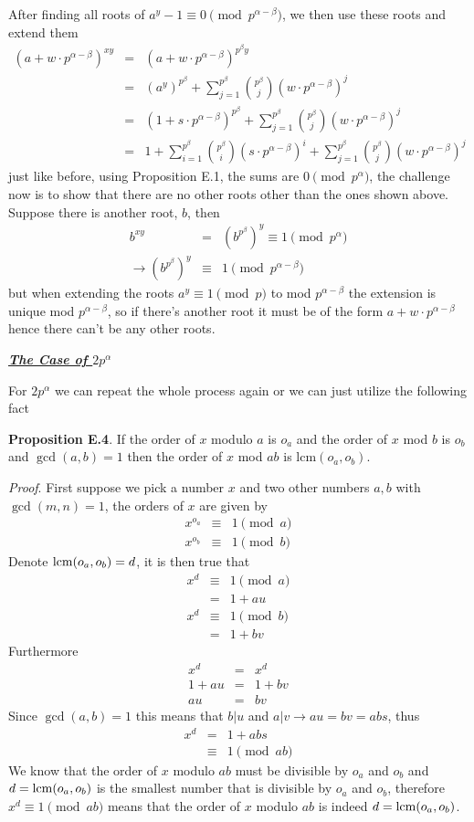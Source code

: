 \documentclass[aps,preprint,preprintnumbers,nofootinbib,showpacs,prd]{revtex4-1}
\newcommand{\nbea}{\begin{eqnarray*}}
\newcommand{\neea}{\end{eqnarray*}}
\begin{document}
After finding all roots of $a^y - 1 \equiv 0 \pmod{p^{\alpha-\beta}}$, we then use these roots and extend them
%
\nbea
(a + w\cdot p^{\alpha-\beta})^{xy} & = & (a + w\cdot p^{\alpha-\beta})^{p^\beta y} \\
& = & (a^y)^{p^\beta} + \sum_{j=1}^{p^\beta} \binom{p^\beta}{j} (w\cdot p^{\alpha-\beta})^j \\
& = & (1 + s\cdot p^{\alpha-\beta})^{p^\beta} + \sum_{j=1}^{p^\beta} \binom{p^\beta}{j} (w\cdot p^{\alpha-\beta})^j \\
& = & 1 + \sum_{i=1}^{p^\beta} \binom{p^\beta}{i} (s\cdot p^{\alpha-\beta})^i + \sum_{j=1}^{p^\beta} \binom{p^\beta}{j} (w\cdot p^{\alpha-\beta})^j
\neea
%
just like before, using Proposition E.1, the sums are $0 \pmod{p^\alpha}$, the challenge now is to show that there are no other roots other than the ones shown above. Suppose there is another root, $b$, then
%
\nbea
b^{xy} & = & \left(b^{p^\beta}\right)^{y} \equiv 1 \pmod{p^\alpha} \\
\to \left(b^{p^\beta}\right)^y & \equiv & 1 \pmod{p^{\alpha-\beta}}
\neea
%
but when extending the roots $a^y \equiv 1 \pmod{p}$ to mod $p^{\alpha-\beta}$ the extension is unique mod $p^{\alpha-\beta}$, so if there's another root it must be of the form $a + w\cdot p^{\alpha-\beta}$ hence there can't be any other roots.

\bigskip
\underline{\textbf{\textit{The Case of $2p^\alpha$}}}
\bigskip

For $2p^\alpha$ we can repeat the whole process again or we can just utilize the following fact 

{\bf Proposition E.4}. If the order of $x$ modulo $a$ is $o_a$ and the order of $x$ mod $b$ is $o_b$ and $\gcd(a,b) = 1$ then the order of $x$ mod $ab$ is lcm$(o_a,o_b)$.

{\it Proof}. First suppose we pick a number $x$ and two other numbers $a,b$ with $\gcd(m,n) = 1$, the orders of $x$ are given by
%
\nbea
x^{o_a} & \equiv & 1 \pmod{a} \\
x^{o_b} & \equiv & 1 \pmod{b}
\neea
%
Denote ${\rm lcm}(o_a,o_b) = d$, it is then true that
%
\nbea
x^d &\equiv & 1 \pmod{a} \\
& = & 1 + au\\
x^d & \equiv & 1 \pmod{b} \\
& = & 1 + bv
\neea
%
Furthermore
%
\nbea
x^d & = & x^d \\
1 + au & = & 1 +bv \\
au & = & bv
\neea
%
Since $\gcd(a,b)=1$ this means that $b|u$ and $a|v \to au=bv = abs$, thus
%
\nbea
x^d & = & 1 + ab s \\
& \equiv & 1 \pmod{ab}
\neea
%
We know that the order of $x$ modulo $ab$ must be divisible by $o_a$ and $o_b$ and $d = {\rm lcm}(o_a,o_b)$ is the smallest number that is divisible by $o_a$ and $o_b$, therefore $x^d \equiv 1 \pmod{ab}$ means that the order of $x$ modulo $ab$ is indeed $d = {\rm lcm}(o_a,o_b)$.
\end{document}
